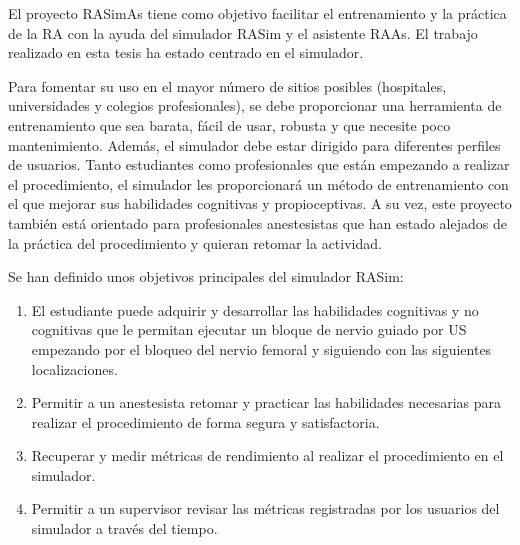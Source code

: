 


El proyecto \ac{RASimAs} tiene como objetivo  facilitar el entrenamiento y la práctica de la \ac{RA} con la ayuda del simulador \ac{RASim} y el asistente \ac{RAAs}. El trabajo realizado en esta tesis ha estado centrado en el simulador.


Para fomentar su uso en el mayor número de sitios posibles (hospitales, universidades y colegios profesionales), se debe proporcionar una herramienta de entrenamiento que sea barata, fácil de usar, robusta y que necesite poco mantenimiento. Además, el simulador debe estar dirigido para diferentes perfiles de usuarios. Tanto estudiantes como profesionales que están empezando a realizar el procedimiento, el simulador les proporcionará un método de entrenamiento con el que mejorar sus habilidades cognitivas y propioceptivas. A su vez, este proyecto también está orientado para profesionales anestesistas que han estado alejados de la práctica del procedimiento y quieran retomar la actividad.


Se han definido unos objetivos principales del simulador \ac{RASim}:
\begin{enumerate}
    \item El estudiante puede adquirir y desarrollar las habilidades cognitivas y no cognitivas que le permitan ejecutar un bloque de nervio guiado por \ac{US} empezando por el bloqueo del nervio femoral y siguiendo con las siguientes localizaciones.
    \item Permitir a un anestesista retomar y practicar las habilidades necesarias para realizar el procedimiento de forma segura y satisfactoria.
    \item Recuperar y medir métricas de rendimiento al realizar el procedimiento en el simulador. 
    \item Permitir a un supervisor revisar las métricas registradas por los usuarios del simulador a través del tiempo.
\end{enumerate}



